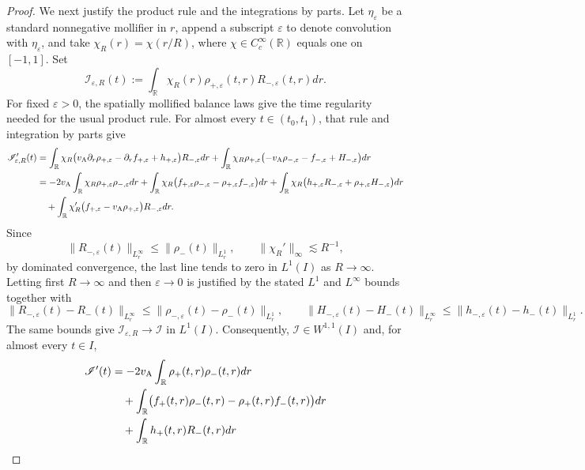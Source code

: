 \documentclass[11pt,reqno]{amsart}
\theoremstyle{plain}
\theoremstyle{definition}
\theoremstyle{remark}
\numberwithin{equation}{section}
\newcommand{\Real}{\mathbb R}
\begin{document}
\begin{proof}
We next justify the product rule and the integrations by parts. Let
$\eta_\varepsilon$ be a standard nonnegative mollifier in $r$, append a
subscript $\varepsilon$ to denote convolution with $\eta_\varepsilon$, and
take $\chi_R(r)=\chi(r/R)$, where $\chi\in C_c^\infty(\Real)$ equals one on
$[-1,1]$. Set
\[
 \mathscr I_{\varepsilon,R}(t)
 :=\int_{\Real}\chi_R(r)
 \rho_{+,\varepsilon}(t,r)R_{-,\varepsilon}(t,r)dr.
\]
For fixed $\varepsilon>0$, the spatially mollified balance laws give the
time regularity needed for the usual product rule. For almost every
$t\in(t_0,t_1)$, that rule and integration by parts give
\[
\begin{aligned}
 \mathscr I_{\varepsilon,R}'(t)
 &=
 \int_{\Real}\chi_R
 \bigl(
  v_{\rm A}\partial_r\rho_{+,\varepsilon}
  -\partial_rf_{+,\varepsilon}
  +h_{+,\varepsilon}
 \bigr)R_{-,\varepsilon}dr+
 \int_{\Real}\chi_R\rho_{+,\varepsilon}
 \bigl(
  -v_{\rm A}\rho_{-,\varepsilon}
  -f_{-,\varepsilon}
  +H_{-,\varepsilon}
 \bigr)dr\\
 &=
 -2v_{\rm A}\int_{\Real}\chi_R
     \rho_{+,\varepsilon}\rho_{-,\varepsilon}dr+
 \int_{\Real}\chi_R
 \bigl(
  f_{+,\varepsilon}\rho_{-,\varepsilon}
  -\rho_{+,\varepsilon}f_{-,\varepsilon}
 \bigr)dr+
 \int_{\Real}\chi_R
 \bigl(
  h_{+,\varepsilon}R_{-,\varepsilon}
  +\rho_{+,\varepsilon}H_{-,\varepsilon}
 \bigr)dr\\
 &\quad+
 \int_{\Real}\chi_R'
 \bigl(f_{+,\varepsilon}
       -v_{\rm A}\rho_{+,\varepsilon}\bigr)
 R_{-,\varepsilon}dr.
\end{aligned}
\]
Since
\[
 \|R_{-,\varepsilon}(t)\|_{L^\infty_r}
 \le\|\rho_-(t)\|_{L^1_r},
 \qquad
 \|\chi_R'\|_\infty\lesssim R^{-1},
\]
by dominated convergence, the last line tends to zero in $L^1(I)$ as $R\to\infty$. Letting first
$R\to\infty$ and then $\varepsilon\to0$ is justified by the stated
$L^1$ and $L^\infty$ bounds together with
\[
 \|R_{-,\varepsilon}(t)-R_-(t)\|_{L^\infty_r}
 \le\|\rho_{-,\varepsilon}(t)-\rho_-(t)\|_{L^1_r},
 \qquad
 \|H_{-,\varepsilon}(t)-H_-(t)\|_{L^\infty_r}
 \le\|h_{-,\varepsilon}(t)-h_-(t)\|_{L^1_r}.
\]
The same bounds give
$\mathscr I_{\varepsilon,R}\to\mathscr I$ in $L^1(I)$. Consequently,
$\mathscr I\in W^{1,1}(I)$ and, for almost every $t\in I$,
\[
\begin{aligned}
 \mathscr I'(t)
 &=
 -2v_{\rm A}\int_{\Real}\rho_+(t,r)\rho_-(t,r)dr\\
 &\quad+
 \int_{\Real}\bigl(f_+(t,r)\rho_-(t,r)
                  -\rho_+(t,r)f_-(t,r)\bigr)dr\\
 &\quad+
 \int_{\Real}h_+(t,r)R_-(t,r)dr

\end{aligned}\]
\end{proof}
\end{document}
